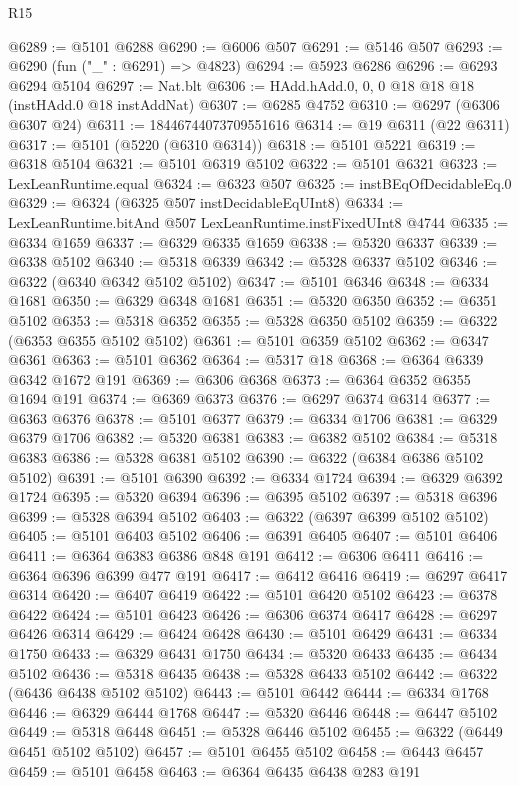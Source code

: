 \begin{lexlean}{R15}
\begin{coremodule}
{{{{{{{{{{{@6289 := @5101 @6288
@6290 := @6006 @507
@6291 := @5146 @507
@6293 := @6290 (fun ("_" : @6291) => @4823)
@6294 := @5923 @6286
@6296 := @6293 @6294 @5104
@6297 := Nat.blt
@6306 := HAdd.hAdd.{0, 0, 0} @18 @18 @18 (instHAdd.{0} @18 instAddNat)
@6307 := @6285 @4752
@6310 := @6297 (@6306 @6307 @24)
@6311 := 18446744073709551616
@6314 := @19 @6311 (@22 @6311)
@6317 := @5101 (@5220 (@6310 @6314))
@6318 := @5101 @5221
@6319 := @6318 @5104
@6321 := @5101 @6319 @5102
@6322 := @5101 @6321
@6323 := LexLeanRuntime.equal
@6324 := @6323 @507
@6325 := instBEqOfDecidableEq.{0}
@6329 := @6324 (@6325 @507 instDecidableEqUInt8)
@6334 := LexLeanRuntime.bitAnd @507 LexLeanRuntime.instFixedUInt8 @4744
@6335 := @6334 @1659
@6337 := @6329 @6335 @1659
@6338 := @5320 @6337
@6339 := @6338 @5102
@6340 := @5318 @6339
@6342 := @5328 @6337 @5102
@6346 := @6322 (@6340 @6342 @5102 @5102)
@6347 := @5101 @6346
@6348 := @6334 @1681
@6350 := @6329 @6348 @1681
@6351 := @5320 @6350
@6352 := @6351 @5102
@6353 := @5318 @6352
@6355 := @5328 @6350 @5102
@6359 := @6322 (@6353 @6355 @5102 @5102)
@6361 := @5101 @6359 @5102
@6362 := @6347 @6361
@6363 := @5101 @6362
@6364 := @5317 @18
@6368 := @6364 @6339 @6342 @1672 @191
@6369 := @6306 @6368
@6373 := @6364 @6352 @6355 @1694 @191
@6374 := @6369 @6373
@6376 := @6297 @6374 @6314
@6377 := @6363 @6376
@6378 := @5101 @6377
@6379 := @6334 @1706
@6381 := @6329 @6379 @1706
@6382 := @5320 @6381
@6383 := @6382 @5102
@6384 := @5318 @6383
@6386 := @5328 @6381 @5102
@6390 := @6322 (@6384 @6386 @5102 @5102)
@6391 := @5101 @6390
@6392 := @6334 @1724
@6394 := @6329 @6392 @1724
@6395 := @5320 @6394
@6396 := @6395 @5102
@6397 := @5318 @6396
@6399 := @5328 @6394 @5102
@6403 := @6322 (@6397 @6399 @5102 @5102)
@6405 := @5101 @6403 @5102
@6406 := @6391 @6405
@6407 := @5101 @6406
@6411 := @6364 @6383 @6386 @848 @191
@6412 := @6306 @6411
@6416 := @6364 @6396 @6399 @477 @191
@6417 := @6412 @6416
@6419 := @6297 @6417 @6314
@6420 := @6407 @6419
@6422 := @5101 @6420 @5102
@6423 := @6378 @6422
@6424 := @5101 @6423
@6426 := @6306 @6374 @6417
@6428 := @6297 @6426 @6314
@6429 := @6424 @6428
@6430 := @5101 @6429
@6431 := @6334 @1750
@6433 := @6329 @6431 @1750
@6434 := @5320 @6433
@6435 := @6434 @5102
@6436 := @5318 @6435
@6438 := @5328 @6433 @5102
@6442 := @6322 (@6436 @6438 @5102 @5102)
@6443 := @5101 @6442
@6444 := @6334 @1768
@6446 := @6329 @6444 @1768
@6447 := @5320 @6446
@6448 := @6447 @5102
@6449 := @5318 @6448
@6451 := @5328 @6446 @5102
@6455 := @6322 (@6449 @6451 @5102 @5102)
@6457 := @5101 @6455 @5102
@6458 := @6443 @6457
@6459 := @5101 @6458
@6463 := @6364 @6435 @6438 @283 @191
}}}}}}}}}}}
\end{coremodule}
\end{lexlean}

